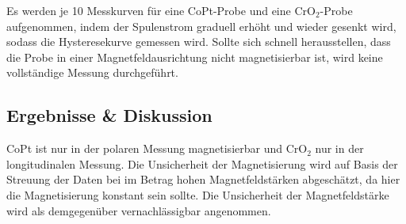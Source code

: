   Es werden je 10 Messkurven für eine CoPt-Probe und eine CrO$_2$-Probe aufgenommen, indem der Spulenstrom graduell erhöht und wieder gesenkt wird, sodass die Hysteresekurve gemessen wird.
  Sollte sich schnell herausstellen, dass die Probe in einer Magnetfeldausrichtung nicht magnetisierbar ist, wird keine vollständige Messung durchgeführt. %


\subsection{Ergebnisse \& Diskussion}

CoPt ist nur in der polaren Messung magnetisierbar und CrO$_2$ nur in der longitudinalen Messung.
Die Unsicherheit der Magnetisierung wird auf Basis der Streuung der Daten bei im Betrag hohen Magnetfeldstärken abgeschätzt, da hier die Magnetisierung konstant sein sollte.
Die Unsicherheit der Magnetfeldstärke wird als demgegenüber vernachlässigbar angenommen.

